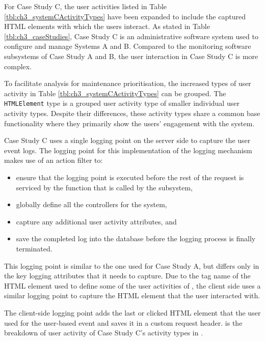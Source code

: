 For Case Study C, the user activities listed in Table \ref{tbl:ch3_systemCActivityTypes} have been expanded to include the captured HTML elements with which the users interact. As stated in Table \ref{tbl:ch3_caseStudies}, Case Study C is an administrative software system used to configure and manage Systems A and B. Compared to the monitoring software subsystems of Case Study A and B, the user interaction in Case Study C is more complex. \par To facilitate analysis for maintenance prioritisation, the increased types of user activity in Table \ref{tbl:ch3_systemCActivityTypes} can be grouped. The \texttt{HTMLElement} type is a grouped user activity type of smaller individual user activity types. Despite their differences, these activity types share a common base functionality where they primarily show the users' engagement with the system.\par Case Study C uses a single logging point on the server side to capture the user event logs. The logging point for this implementation of the logging mechanism makes use of an action filter to:

\begin{itemize}
	\item ensure that the logging point is executed before the rest of the request is serviced by the function that is called by the subsystem,
	\item globally define all the controllers for the system,
	\item capture any additional user activity attributes, and
	\item save the completed log into the database before the logging process is finally terminated.
\end{itemize}

This logging point is similar to the one used for Case Study A, but differs only in the key logging attributes that it needs to capture. Due to the tag name of the HTML element used to define some of the user activities of , the client side uses a similar logging point to capture the HTML element that the user interacted with.\par The client-side logging point adds the last or clicked HTML element that the user used for the user-based event and saves it in a custom request header.  is the breakdown of user activity of Case Study C's activity types in .

